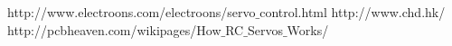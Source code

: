 \begin{thebibliography}{9}

 \label{ref:PWM} http://www.electroons.com/electroons/servo$\_$control.html
 \label{ref:PowerHD} http://www.chd.hk/
 \label{ref:SerCtrl} http://pcbheaven.com/wikipages/How$\_$RC$\_$Servos$\_$Works/

\end{thebibliography}